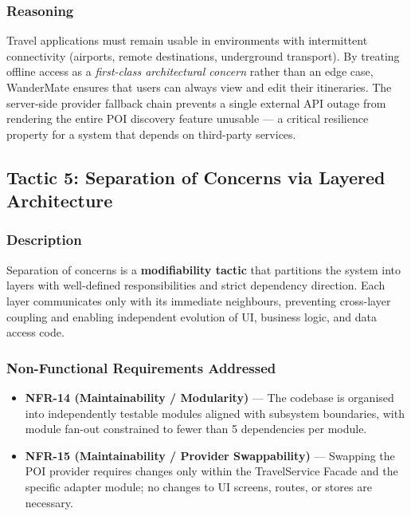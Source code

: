 \documentclass[12pt, a4paper]{article}
\begin{document}
\subsubsection{Reasoning}

Travel applications must remain usable in environments with intermittent connectivity (airports, remote destinations, underground transport). By treating offline access as a \emph{first-class architectural concern} rather than an edge case, WanderMate ensures that users can always view and edit their itineraries. The server-side provider fallback chain prevents a single external API outage from rendering the entire POI discovery feature unusable --- a critical resilience property for a system that depends on third-party services.

\subsection{Tactic 5: Separation of Concerns via Layered Architecture}

\subsubsection{Description}

Separation of concerns is a \textbf{modifiability tactic} that partitions the system into layers with well-defined responsibilities and strict dependency direction. Each layer communicates only with its immediate neighbours, preventing cross-layer coupling and enabling independent evolution of UI, business logic, and data access code.

\subsubsection{Non-Functional Requirements Addressed}

\begin{itemize}
  \item \textbf{NFR-14 (Maintainability / Modularity)} --- The codebase is organised into independently testable modules aligned with subsystem boundaries, with module fan-out constrained to fewer than 5 dependencies per module.
  \item \textbf{NFR-15 (Maintainability / Provider Swappability)} --- Swapping the POI provider requires changes only within the TravelService Facade and the specific adapter module; no changes to UI screens, routes, or stores are necessary.
\end{itemize}
\end{document}
